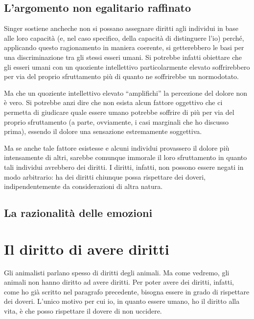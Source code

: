 \documentclass[a4paper,11pt,oneside,article]{memoir}
\begin{document}
\section{L'argomento non egalitario raffinato}

Singer sostiene anche\footnotemark[3] che non si possano assegnare diritti agli
individui in base alle loro capacità (e, nel caso specifico, della capacità di
distinguere l'io) perché, applicando questo ragionamento in maniera coerente, si
getterebbero le basi per una discriminazione tra gli stessi esseri umani. Si
potrebbe infatti obiettare che gli esseri umani con un quoziente intellettivo
particolarmente elevato soffrirebbero per via del proprio sfruttamento più di
quanto ne soffrirebbe un normodotato.

Ma che un quoziente intellettivo elevato ``amplifichi'' la percezione del dolore
non è vero. Si potrebbe anzi dire che non esista alcun fattore oggettivo che ci
permetta di giudicare quale essere umano potrebbe soffrire di più per via del
proprio sfruttamento (a parte, ovviamente, i casi marginali che ho discusso
prima), essendo il dolore una sensazione estremamente soggettiva.

Ma se anche tale fattore esistesse e alcuni individui provassero il dolore più
intensamente di altri, sarebbe comunque immorale il loro sfruttamento in quanto
tali individui avrebbero dei diritti. I diritti, infatti, non possono essere
negati in modo arbitrario: ha dei diritti chiunque possa rispettare dei doveri,
indipendentemente da considerazioni di altra natura.

\section{La razionalità delle emozioni}


\chapter{Il diritto di avere diritti}

Gli animalisti parlano spesso di diritti degli animali. Ma come vedremo, gli
animali non hanno diritto ad avere diritti. Per poter avere dei diritti,
infatti, come ho già scritto nel paragrafo precedente, bisogna essere in grado
di rispettare dei doveri. L'unico motivo per cui io, in quanto essere umano, ho
il diritto alla vita, è che posso rispettare il dovere di non uccidere.
\end{document}
